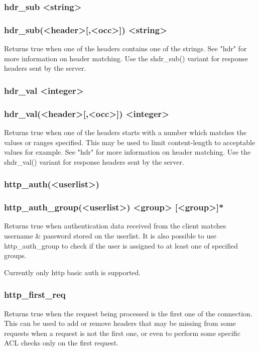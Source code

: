 \subsubsection[hdr\_sub]{hdr\_sub <string>}
\subsubsection*{hdr\_sub(<header>[,<occ>]) <string>}
  Returns true when one of the headers contains one of the strings. See "hdr"
  for more information on header matching. Use the shdr\_sub() variant for
  response headers sent by the server.

\subsubsection[hdr\_val]{hdr\_val <integer>}
\subsubsection{hdr\_val(<header>[,<occ>]) <integer>}
  Returns true when one of the headers starts with a number which matches the
  values or ranges specified. This may be used to limit content-length to
  acceptable values for example. See "hdr" for more information on header
  matching. Use the shdr\_val() variant for response headers sent by the server.

\subsubsection[http\_auth]{http\_auth(<userlist>)}
\subsubsection[http\_auth\_group]{http\_auth\_group(<userlist>) <group> [<group>]*}
  Returns true when authentication data received from the client matches
  username \& password stored on the userlist. It is also possible to
  use http\_auth\_group to check if the user is assigned to at least one
  of specified groups.

  Currently only http basic auth is supported.

\subsubsection[http\_first\_req]{http\_first\_req}
  Returns true when the request being processed is the first one of the
  connection. This can be used to add or remove headers that may be missing
  from some requests when a request is not the first one, or even to perform
  some specific ACL checks only on the first request.

